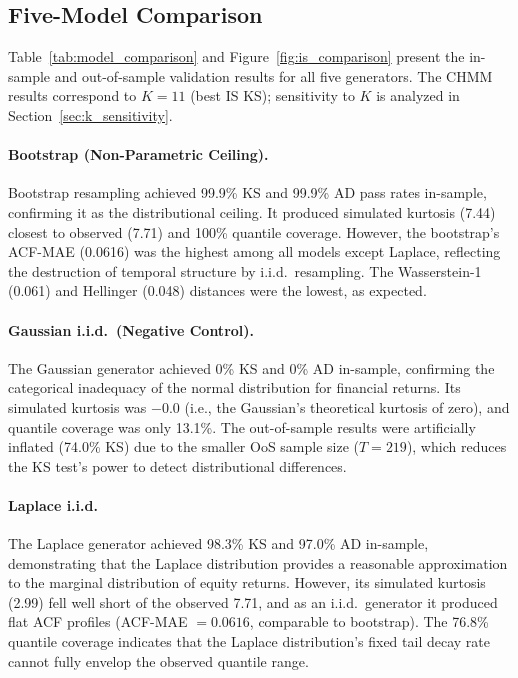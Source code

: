 \subsection{Five-Model Comparison}
\label{sec:model_comparison}

Table~\ref{tab:model_comparison} and Figure~\ref{fig:is_comparison} present the in-sample and out-of-sample validation results for all five generators.
The CHMM results correspond to $K = 11$ (best IS KS); sensitivity to $K$ is analyzed in Section~\ref{sec:k_sensitivity}.

\paragraph{Bootstrap (Non-Parametric Ceiling).}
Bootstrap resampling achieved 99.9\% KS and 99.9\% AD pass rates in-sample, confirming it as the distributional ceiling.
It produced simulated kurtosis (7.44) closest to observed (7.71) and 100\% quantile coverage.
However, the bootstrap's ACF-MAE (0.0616) was the highest among all models except Laplace, reflecting the destruction of temporal structure by i.i.d.\ resampling.
The Wasserstein-1 (0.061) and Hellinger (0.048) distances were the lowest, as expected.

\paragraph{Gaussian i.i.d.\ (Negative Control).}
The Gaussian generator achieved 0\% KS and 0\% AD in-sample, confirming the categorical inadequacy of the normal distribution for financial returns.
Its simulated kurtosis was $-0.0$ (i.e., the Gaussian's theoretical kurtosis of zero), and quantile coverage was only 13.1\%.
The out-of-sample results were artificially inflated (74.0\% KS) due to the smaller OoS sample size ($T = 219$), which reduces the KS test's power to detect distributional differences.

\paragraph{Laplace i.i.d.}
The Laplace generator achieved 98.3\% KS and 97.0\% AD in-sample, demonstrating that the Laplace distribution provides a reasonable approximation to the marginal distribution of equity returns.
However, its simulated kurtosis (2.99) fell well short of the observed 7.71, and as an i.i.d.\ generator it produced flat ACF profiles (ACF-MAE $= 0.0616$, comparable to bootstrap).
The 76.8\% quantile coverage indicates that the Laplace distribution's fixed tail decay rate cannot fully envelop the observed quantile range.

